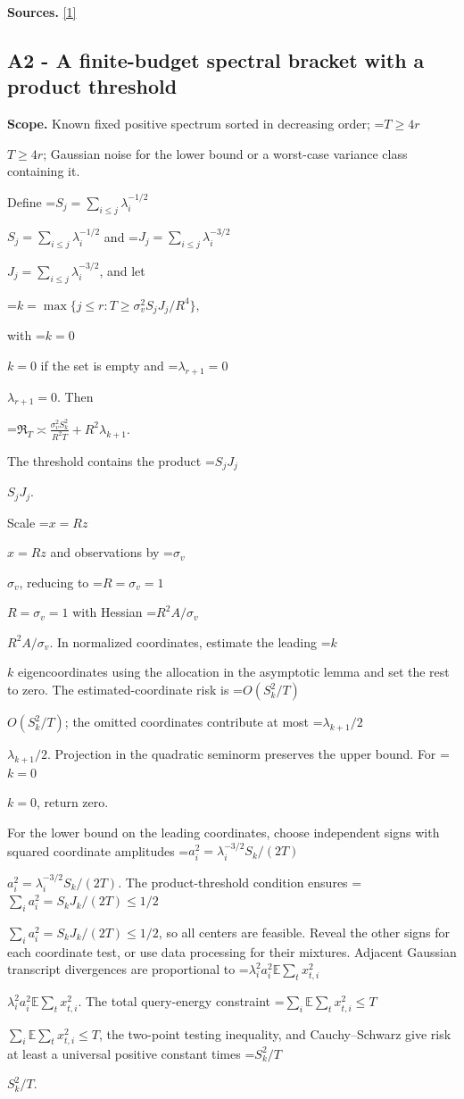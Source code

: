 \documentclass[10pt,a4paper]{article}
\newcommand{\AtlasMath}[1]{\par\begingroup\centering\setbox0=\hbox{$\displaystyle #1$}\ifdim\wd0>1.4\linewidth\typeout{ATLAS WIDE FORMULA: \the\wd0}\fi\ifdim\wd0>\linewidth\resizebox{\linewidth}{!}{\box0}\else\box0\fi\par\endgroup}
\newcommand{\AtlasInlineMath}[1]{\begingroup\setbox0=\hbox{$#1$}\ifdim\wd0>.4\linewidth\endgroup\AtlasMath{#1}\else\endgroup$#1$\fi}
\begin{document}
\textbf{Sources.} \href{https://proceedings.neurips.cc/paper_files/paper/2023/file/6e60a9023d2c63f7f0856910129ae753-Paper-Conference.pdf}{[1]}

\subsection{A2 - A finite-budget spectral bracket with a product threshold}
\textbf{Scope.} Known fixed positive spectrum sorted in decreasing order; \AtlasInlineMath{T\ge4r}; Gaussian noise for the lower bound or a worst-case variance class containing it.

Define \AtlasInlineMath{S_j=\sum_{i\le j}\lambda_i^{-1/2}} and \AtlasInlineMath{J_j=\sum_{i\le j}\lambda_i^{-3/2}}, and let

\AtlasMath{k=\max\{j\le r:T\ge\sigma_v^2S_jJ_j/R^4\},}

with \AtlasInlineMath{k=0} if the set is empty and \AtlasInlineMath{\lambda_{r+1}=0}. Then

\AtlasMath{\mathfrak R_T\asymp\frac{\sigma_v^2S_k^2}{R^2T}+R^2\lambda_{k+1}.}

The threshold contains the product \AtlasInlineMath{S_jJ_j}.

Scale \AtlasInlineMath{x=Rz} and observations by \AtlasInlineMath{\sigma_v}, reducing to \AtlasInlineMath{R=\sigma_v=1} with Hessian \AtlasInlineMath{R^2A/\sigma_v}. In normalized coordinates, estimate the leading \AtlasInlineMath{k} eigencoordinates using the allocation in the asymptotic lemma and set the rest to zero. The estimated-coordinate risk is \AtlasInlineMath{O(S_k^2/T)}; the omitted coordinates contribute at most \AtlasInlineMath{\lambda_{k+1}/2}. Projection in the quadratic seminorm preserves the upper bound. For \AtlasInlineMath{k=0}, return zero.

For the lower bound on the leading coordinates, choose independent signs with squared coordinate amplitudes \AtlasInlineMath{a_i^2=\lambda_i^{-3/2}S_k/(2T)}. The product-threshold condition ensures \AtlasInlineMath{\sum_i a_i^2=S_kJ_k/(2T)\le1/2}, so all centers are feasible. Reveal the other signs for each coordinate test, or use data processing for their mixtures. Adjacent Gaussian transcript divergences are proportional to \AtlasInlineMath{\lambda_i^2a_i^2\mathbb E\sum_tx_{t,i}^2}. The total query-energy constraint \AtlasInlineMath{\sum_i\mathbb E\sum_tx_{t,i}^2\le T}, the two-point testing inequality, and Cauchy--Schwarz give risk at least a universal positive constant times \AtlasInlineMath{S_k^2/T}.
\end{document}
